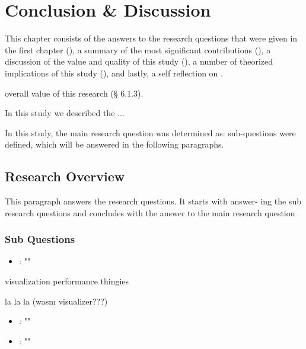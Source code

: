 \chapter{Conclusion \& Discussion}
\label{chap:conclusion}

This chapter consists of the answers to the research
questions that were given in the first chapter (), 
a summary of the most significant contributions (), 
a discussion of the value and quality of this study (),
a number of theorized implications of this study (),
and lastly, a self reflection on .


overall value of this research (§ 6.1.3).


In this study we described the ...

In this study, the main research question was determined as: \myMainRQ
sub-questions were defined, which will be answered in the following paragraphs.


\section{Research Overview}
\label{sec:answers}

This paragraph answers the research questions. 
It starts with answer-
ing the sub research questions and concludes with the answer to the
main research question

\subsection*{Sub Questions}

\begin{itemize}[ ]
  \item \emph{\mySubRQOneTitle:} "\mySubRQOne"
\end{itemize}

visualization performance thingies

la la la
(wasm visualizer???)

\begin{itemize}[ ]
  \item \emph{\mySubRQTwoTitle:} "\mySubRQTwo"
\end{itemize}



\begin{itemize}[ ]
  \item \emph{\mySubRQThreeTitle:}  "\mySubRQThree"
\end{itemize}


